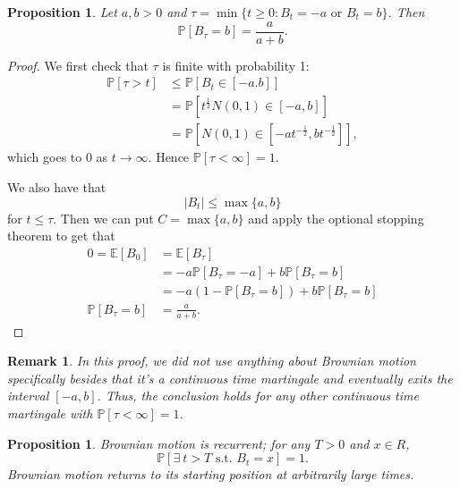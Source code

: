 \documentclass{tufte-handout}
\newcommand*\E{\mathbb{E}}
\renewcommand*\P{\mathbb{P}}
\newtheorem{rmk}[thm]{Remark}
\newtheorem{prop}[thm]{Proposition}
\theoremstyle{definition}
\begin{document}
\begin{prop}
	Let $a,b > 0$ and $\tau = \min \{t \ge 0 : B_t = -a \text{ or } B_t = b\}$. Then \[
		\P\left[B_\tau = b\right]  = \frac{a}{a+b}
	.\] 
\end{prop}
\begin{proof}
	We first check that $\tau$ is finite with probability 1:
	\begin{align*}
		\P\left[\tau > t\right] &\le \P\left[B_t \in [-a.b]\right] \\
								&= \P\left[t ^{\frac{1}{2}} N(0,1) \in [-a,b]\right]  \\
								&= \P\left[N(0,1) \in \left[ -at ^{-\frac{1}{2}}, b t ^{-\frac{1}{2}} \right]\right]					
	,\end{align*} 
	which goes to $0$ as $t \to \infty$. Hence $\P\left[\tau < \infty\right] = 1$.

	We also have that \[
		\left| B_t \right| \le \max \{a,b\}
	\] for $t \le \tau$. Then we can put $C = \max \{a,b\}$ and apply the optional stopping theorem to get that
	\begin{align*}
		0 = \E\left[B_0\right] &= \E\left[B_\tau\right] \\
		&= -a \P\left[B_\tau = -a\right] + b \P\left[B_\tau = b\right]  \\
		&= -a \left( 1- \P\left[B_\tau = b\right]  \right) + b \P\left[B_\tau = b\right]  \\
		\P\left[B_\tau = b \right] &= \frac{a}{a+b}
	.\end{align*}
\end{proof}

\begin{rmk}
	In this proof, we did not use anything about Brownian motion specifically besides that it's a continuous time martingale and eventually exits the interval $[-a,b]$. Thus, the conclusion holds for any other continuous time martingale with $\P\left[\tau < \infty\right] = 1$.
\end{rmk}

\begin{prop}
	Brownian motion is recurrent; for any $T > 0$ and $x \in R$, \[
		\P\left[\exists\ t > T \text{ s.t. } B_t = x\right] = 1
	.\] Brownian motion returns to its starting position at arbitrarily large times.
\end{prop}
\end{document}
